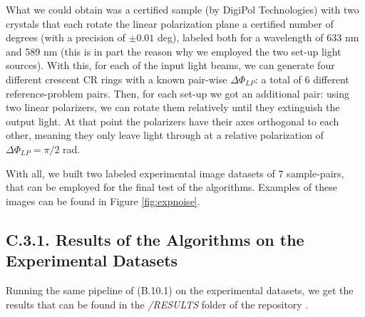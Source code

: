 \documentclass[11pt, a4paper, twoside]{article} %
\begin{document}
What we could obtain was a certified sample (by DigiPol Technologies) with two crystals that each rotate the linear polarization plane a certified number of degrees (with a precision of $\pm 0.01$ deg), labeled both for a wavelength of 633 nm and 589 nm (this is in part the reason why we employed the two set-up light sources). With this, for each of the input light beams, we can generate four different crescent CR rings with a known pair-wise $\Delta \Phi_{LP}$: a total of 6 different reference-problem pairs. Then, for each set-up we got an additional pair: using two linear polarizers, we can rotate them relatively until they extinguish the output light. At that point the polarizers have their axes orthogonal to each other, meaning they only leave light through at a relative polarization of $\Delta \Phi_{LP}=\pi/2$ rad.

With all, we built two labeled experimental image datasets of 7 sample-pairs, that can be employed for the final test of the algorithms. Examples of these images can be found in Figure \ref{fig:expnoise}.	\vspace{-0.35cm}

\subsection*{C.3.1. Results of the Algorithms on the Experimental Datasets}\vspace{-0.05cm}
Running the same pipeline of (B.10.1) on the experimental datasets, we get the results that can be found in the {\em /RESULTS} folder of the repository \cite{github}.
\end{document}
